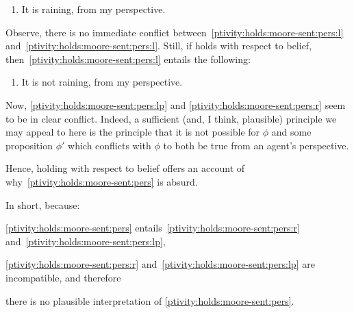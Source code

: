 \begin{note}
  \begin{enumerate}[label=\emph{M\('\)\textsubscript{r}}., ref=(\emph{M\('\)\textsubscript{r}})]
  \item
    \label{ptivity:holds:moore-sent:pers:r}
    It is raining, from my perspective.
  \end{enumerate}

  Observe, there is no immediate conflict between~\ref{ptivity:holds:moore-sent:pers:l} and~\ref{ptivity:holds:moore-sent:pers:l}.
  Still, if \ptivity{} holds with respect to belief, then~\ref{ptivity:holds:moore-sent:pers:l} entails the following:

  \begin{enumerate}[label=\emph{M\('\)\textsubscript{l\('\)}}., ref=(\emph{M\('\)\textsubscript{l\('\)}})]
  \item
    \label{ptivity:holds:moore-sent:pers:lp}
    It is not raining, from my perspective.
  \end{enumerate}

  Now, \ref{ptivity:holds:moore-sent:pers:lp} and \ref{ptivity:holds:moore-sent:pers:r} seem to be in clear conflict.
  Indeed, a sufficient (and, I think, plausible) principle we may appeal to here is the principle that it is not possible for \(\phi\) and some proposition \(\phi'\) which conflicts with \(\phi\) to both be true from an agent's perspective.

  Hence, \ptivity{} holding with respect to belief offers an account of why~\ref{ptivity:holds:moore-sent:pers} is absurd.

  In short, because:
  \begin{enumerate*}[label=(\roman*)]
  \item
    \ref{ptivity:holds:moore-sent:pers} entails~\ref{ptivity:holds:moore-sent:pers:r} and~\ref{ptivity:holds:moore-sent:pers:lp},
  \item
    \ref{ptivity:holds:moore-sent:pers:r} and~\ref{ptivity:holds:moore-sent:pers:lp} are incompatible, and therefore
  \item
    there is no plausible interpretation of \ref{ptivity:holds:moore-sent:pers}.
  \end{enumerate*}
\end{note}

